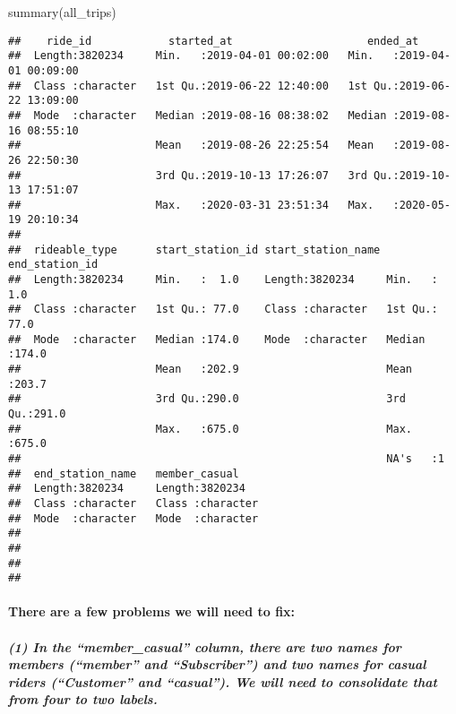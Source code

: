 \documentclass[
]{article}
\newenvironment{Shaded}{\begin{snugshade}}{\end{snugshade}}
\newcommand{\FunctionTok}[1]{\textcolor[rgb]{0.00,0.00,0.00}{#1}}
\newcommand{\NormalTok}[1]{#1}
\begin{document}
\begin{Shaded}
\begin{Highlighting}[]
\FunctionTok{summary}\NormalTok{(all\_trips)}
\end{Highlighting}
\end{Shaded}

\begin{verbatim}
##    ride_id            started_at                     ended_at                  
##  Length:3820234     Min.   :2019-04-01 00:02:00   Min.   :2019-04-01 00:09:00  
##  Class :character   1st Qu.:2019-06-22 12:40:00   1st Qu.:2019-06-22 13:09:00  
##  Mode  :character   Median :2019-08-16 08:38:02   Median :2019-08-16 08:55:10  
##                     Mean   :2019-08-26 22:25:54   Mean   :2019-08-26 22:50:30  
##                     3rd Qu.:2019-10-13 17:26:07   3rd Qu.:2019-10-13 17:51:07  
##                     Max.   :2020-03-31 23:51:34   Max.   :2020-05-19 20:10:34  
##                                                                                
##  rideable_type      start_station_id start_station_name end_station_id 
##  Length:3820234     Min.   :  1.0    Length:3820234     Min.   :  1.0  
##  Class :character   1st Qu.: 77.0    Class :character   1st Qu.: 77.0  
##  Mode  :character   Median :174.0    Mode  :character   Median :174.0  
##                     Mean   :202.9                       Mean   :203.7  
##                     3rd Qu.:290.0                       3rd Qu.:291.0  
##                     Max.   :675.0                       Max.   :675.0  
##                                                         NA's   :1      
##  end_station_name   member_casual     
##  Length:3820234     Length:3820234    
##  Class :character   Class :character  
##  Mode  :character   Mode  :character  
##                                       
##                                       
##                                       
## 
\end{verbatim}

\hypertarget{there-are-a-few-problems-we-will-need-to-fix}{%
\paragraph{There are a few problems we will need to
fix:}\label{there-are-a-few-problems-we-will-need-to-fix}}

\hypertarget{in-the-member_casual-column-there-are-two-names-for-members-member-and-subscriber-and-two-names-for-casual-riders-customer-and-casual.-we-will-need-to-consolidate-that-from-four-to-two-labels.}{%
\subparagraph{(1) In the ``member\_casual'' column, there are two names
for members (``member'' and ``Subscriber'') and two names for casual
riders (``Customer'' and ``casual''). We will need to consolidate that
from four to two
labels.}\label{in-the-member_casual-column-there-are-two-names-for-members-member-and-subscriber-and-two-names-for-casual-riders-customer-and-casual.-we-will-need-to-consolidate-that-from-four-to-two-labels.}}
\end{document}
